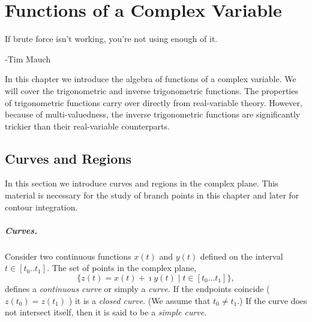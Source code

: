 
\flushbottom






\chapter{Functions of a Complex Variable}


If brute force isn't working, you'{}re not using enough of it.

\begin{flushright}
  -Tim Mauch
\end{flushright}






In this chapter we introduce the algebra of functions of a complex
variable.  We will cover the trigonometric and inverse trigonometric 
functions.  The properties of trigonometric functions carry over 
directly from real-variable theory.  However, because of multi-valuedness,
the inverse trigonometric functions are significantly trickier than
their real-variable counterparts.









\section{Curves and Regions}


In this section we introduce curves and regions in the complex plane.  This 
material is necessary for the study of branch points in this chapter and
later for contour integration.


\paragraph{Curves.}
Consider two continuous functions $x(t)$ and $y(t)$ defined on the
interval $t \in [t_0 .. t_1]$.  The set of points in the complex plane,
\[
\{ z(t) = x(t) + \imath y(t) \mid t \in [t_0 \ldots t_1] \},
\]
defines a \textit{continuous curve} or simply a \textit{curve}.
If the endpoints coincide ( $z \left( t_0 \right) = z \left( t_1 \right)$ )
it is a \textit{closed curve}.
(We assume that $t_0 \neq t_1$.)
If the curve does not intersect itself, then it is said to be a
\textit{simple curve}.

